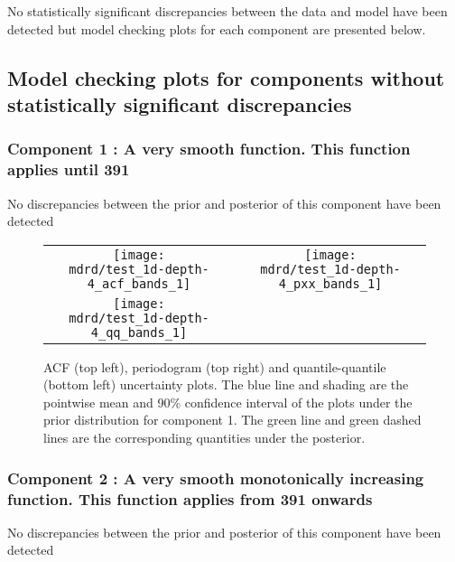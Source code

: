 \documentclass{article} %
\begin{document}
No statistically significant discrepancies between the data and model have been detected but model checking plots for each component are presented below.

\subsection{Model checking plots for components without statistically significant discrepancies}

\subsubsection{Component 1 : A very smooth function. This function applies until  391}

No discrepancies between the prior and posterior of this component have been detected

\begin{figure}[H]
\newcommand{\wmgd}{0.5\columnwidth}
\newcommand{\hmgd}{3.0cm}
\newcommand{\mdrd}{test_1d-depth-4}
\newcommand{\mbm}{\hspace{-0.3cm}}
\begin{tabular}{cc}
\mbm \texttt{[image: \\mdrd/test\_1d-depth-4\_acf\_bands\_1]} & \texttt{[image: \\mdrd/test\_1d-depth-4\_pxx\_bands\_1]} \\
\mbm \texttt{[image: \\mdrd/test\_1d-depth-4\_qq\_bands\_1]}
\end{tabular}
\caption{
ACF (top left), periodogram (top right) and quantile-quantile (bottom left) uncertainty plots.
The blue line and shading are the pointwise mean and 90\% confidence interval of the plots under the prior distribution for component 1.
The green line and green dashed lines are the corresponding quantities under the posterior.}
\label{fig:check1}
\end{figure}

\subsubsection{Component 2 : A very smooth monotonically increasing function. This function applies from  391 onwards}

No discrepancies between the prior and posterior of this component have been detected
\end{document}
